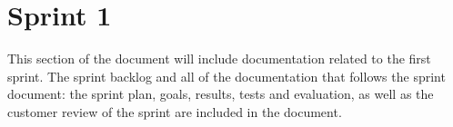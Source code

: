 \documentclass[../document.tex]{subfiles}
\begin{document}
\section*{Sprint 1}

This section of the document will include documentation related to the first sprint. The sprint backlog and all of the documentation that follows the sprint document: the sprint plan, goals, results, tests and evaluation, as well as the customer review of the sprint are included in the document.
\end{document}
